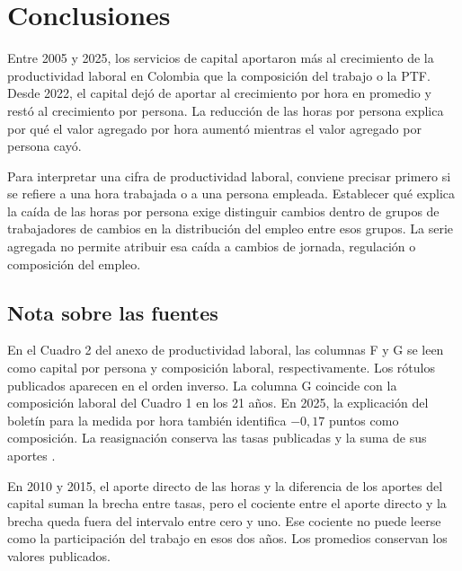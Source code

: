 \clearpage
\section{Conclusiones}

Entre 2005 y 2025, los servicios de capital aportaron más al crecimiento de la productividad laboral en Colombia que la composición del trabajo o la PTF. Desde 2022, el capital dejó de aportar al crecimiento por hora en promedio y restó al crecimiento por persona. La reducción de las horas por persona explica por qué el valor agregado por hora aumentó mientras el valor agregado por persona cayó.

Para interpretar una cifra de productividad laboral, conviene precisar primero si se refiere a una hora trabajada o a una persona empleada. Establecer qué explica la caída de las horas por persona exige distinguir cambios dentro de grupos de trabajadores de cambios en la distribución del empleo entre esos grupos. La serie agregada no permite atribuir esa caída a cambios de jornada, regulación o composición del empleo.

\subsection*{Nota sobre las fuentes}

En el Cuadro 2 del anexo de productividad laboral, las columnas F y G se leen como capital por persona y composición laboral, respectivamente. Los rótulos publicados aparecen en el orden inverso. La columna G coincide con la composición laboral del Cuadro 1 en los 21 años. En 2025, la explicación del boletín para la medida por hora también identifica $-0{,}17$ puntos como composición. La reasignación conserva las tasas publicadas y la suma de sus aportes \citep{daneAnexo,daneBol,daneMet}.

En 2010 y 2015, el aporte directo de las horas y la diferencia de los aportes del capital suman la brecha entre tasas, pero el cociente entre el aporte directo y la brecha queda fuera del intervalo entre cero y uno. Ese cociente no puede leerse como la participación del trabajo en esos dos años. Los promedios conservan los valores publicados.
